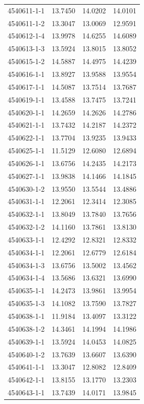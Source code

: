 \begin{longtable}{lrrr}
4540611-1-1 & 13.7450 & 14.0202 & 14.0101 \\
4540611-1-2 & 13.3047 & 13.0069 & 12.9591 \\
4540612-1-4 & 13.9978 & 14.6255 & 14.6089 \\
4540613-1-3 & 13.5924 & 13.8015 & 13.8052 \\
4540615-1-2 & 14.5887 & 14.4975 & 14.4239 \\
4540616-1-1 & 13.8927 & 13.9588 & 13.9554 \\
4540617-1-1 & 14.5087 & 13.7514 & 13.7687 \\
4540619-1-1 & 13.4588 & 13.7475 & 13.7241 \\
4540620-1-1 & 14.2659 & 14.2626 & 14.2786 \\
4540621-1-1 & 13.7432 & 14.2187 & 14.2372 \\
4540622-1-1 & 13.7704 & 13.9235 & 13.9433 \\
4540625-1-1 & 11.5129 & 12.6080 & 12.6894 \\
4540626-1-1 & 13.6756 & 14.2435 & 14.2173 \\
4540627-1-1 & 13.9838 & 14.1466 & 14.1845 \\
4540630-1-2 & 13.9550 & 13.5544 & 13.4886 \\
4540631-1-1 & 12.2061 & 12.3414 & 12.3085 \\
4540632-1-1 & 13.8049 & 13.7840 & 13.7656 \\
4540632-1-2 & 14.1160 & 13.7861 & 13.8130 \\
4540633-1-1 & 12.4292 & 12.8321 & 12.8332 \\
4540634-1-1 & 12.2061 & 12.6779 & 12.6184 \\
4540634-1-3 & 13.6756 & 13.5002 & 13.4562 \\
4540634-1-4 & 13.5686 & 13.6321 & 13.6990 \\
4540635-1-1 & 14.2473 & 13.9861 & 13.9954 \\
4540635-1-3 & 14.1082 & 13.7590 & 13.7827 \\
4540638-1-1 & 11.9184 & 13.4097 & 13.3122 \\
4540638-1-2 & 14.3461 & 14.1994 & 14.1986 \\
4540639-1-1 & 13.5924 & 14.0453 & 14.0825 \\
4540640-1-2 & 13.7639 & 13.6607 & 13.6390 \\
4540641-1-1 & 13.3047 & 12.8082 & 12.8409 \\
4540642-1-1 & 13.8155 & 13.1770 & 13.2303 \\
4540643-1-1 & 13.7439 & 14.0171 & 13.9845 \\

\end{longtable}

